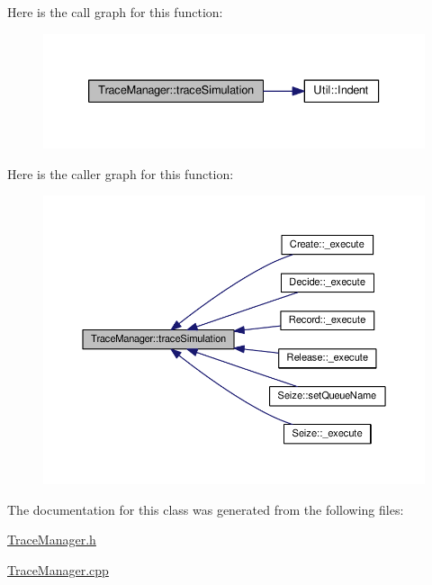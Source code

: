 Here is the call graph for this function\+:\nopagebreak
\begin{figure}[H]
\begin{center}
\leavevmode
\includegraphics[width=333pt]{class_trace_manager_a5ee0bbb874cc0ad40ff5b1a130a0699f_cgraph}
\end{center}
\end{figure}




Here is the caller graph for this function\+:\nopagebreak
\begin{figure}[H]
\begin{center}
\leavevmode
\includegraphics[width=350pt]{class_trace_manager_a5ee0bbb874cc0ad40ff5b1a130a0699f_icgraph}
\end{center}
\end{figure}




The documentation for this class was generated from the following files\+:\begin{DoxyCompactItemize}
\item 
\hyperlink{_trace_manager_8h}{Trace\+Manager.\+h}\item 
\hyperlink{_trace_manager_8cpp}{Trace\+Manager.\+cpp}\end{DoxyCompactItemize}
